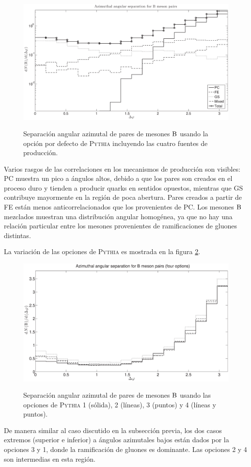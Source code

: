 \documentclass[a4paper,12pt]{article}
\begin{document}
\begin{figure}[!h]
\centering
\caption[Separación angular azimutal de pares de mesones $\B$. Opción por defecto de \textsc{Pythia}.]{Separación angular azimutal de pares de mesones $\B$ usando la opción por defecto de \textsc{Pythia} incluyendo las cuatro fuentes de producción.}
\includegraphics[width=15cm]{BBPhiOp1}
\label{fig:BBPhiOp1}
\end{figure}
Varios rasgos de las correlaciones en los mecanismos de producción son visibles: PC muestra un pico a ángulos altos, debido a que los pares son creados en el proceso duro y tienden a producir quarks en sentidos opuestos, mientras que GS contribuye mayormente en la región de poca abertura. Pares creados a partir de FE están menos anticorrelacionados que los provenientes de PC. Los mesones $\B$ mezclados muestran una distribución angular homogénea, ya que no hay una relación particular entre los mesones provenientes de ramificaciones de gluones distintas.

La variación de las opciones de \textsc{Pythia} es mostrada en la figura \ref{fig:BBPhi4Op}.

\begin{figure}[!h]
\centering
\caption[Separación angular de pares de mesones $\B$. Cuatro opciones de \textsc{Pythia}.]{Separación angular azimutal de pares de mesones $\B$ usando las opciones de \textsc{Pythia} 1 (sólida), 2 (líneas), 3 (puntos) y 4 (líneas y puntos).}
\includegraphics[width=15cm]{BBPhi4Op}
\label{fig:BBPhi4Op}
\end{figure}
De manera similar al caso discutido en la subsección previa, los dos casos extremos (superior e inferior) a ángulos azimutales bajos están dados por la opciones 3 y 1, donde la ramificación de gluones es dominante. Las opciones 2 y 4 son intermedias en esta región.
\end{document}
